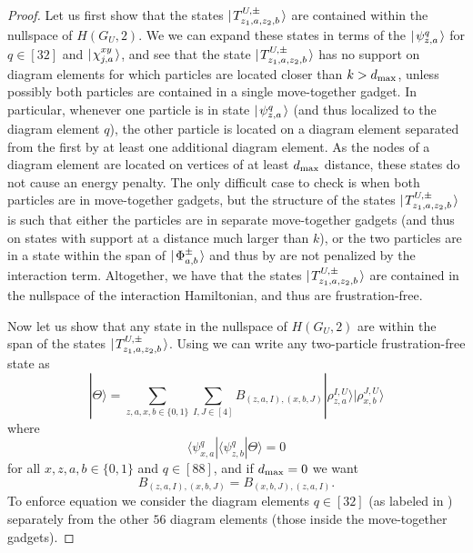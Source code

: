 \documentclass[../thesis-main/thesis-main]{subfiles}
\begin{document}
\begin{proof}

Let us first show that the states $|\mspace{2mu} T_{z_1,a,z_2,b}^{U,\pm} \mspace{2mu} \rangle$ are contained within the nullspace of $H(G_U,2)$.   We we can expand these states in terms of the $|\mspace{2mu} \psi^q_{z,a} \mspace{2mu} \rangle$ for $q\in[32]$ and $|\mspace{2mu} \chi_{j,a}^{xy} \mspace{2mu} \rangle$, and see that the state $|\mspace{2mu} T_{z_1,a,z_2,b}^{U,\pm} \mspace{2mu} \rangle$ has no support on diagram elements for which particles are located closer than $k > d_{\text{max}}$, unless possibly both particles are contained in a single move-together gadget.   In particular, whenever one particle is in state $|\mspace{2mu} \psi^q_{z,a} \mspace{2mu} \rangle$ (and thus localized to the diagram element $q$), the other particle is located on a diagram element separated from the first by at least one additional diagram element.  As the nodes of a diagram element are located on vertices of at least $d_{\text{max}}$ distance, these states do not cause an energy penalty.  The only difficult case to check is when both particles are in move-together gadgets, but the structure of the states $|\mspace{2mu} T_{z_1,a,z_2,b}^{U,\pm} \mspace{2mu} \rangle$ is such that either the particles are in separate move-together gadgets (and thus on states with support at a distance much larger than $k$), or the two particles are in a state within the span of $|\mspace{2mu} \Phi_{a,b}^{\pm} \mspace{2mu} \rangle$ and thus by  are not penalized by the interaction term.  Altogether, we have that the states $|\mspace{2mu} T_{z_1,a,z_2,b}^{U,\pm} \mspace{2mu} \rangle$ are contained in the nullspace of the interaction Hamiltonian, and thus are frustration-free.

Now let us show that any state in the nullspace of $H(G_U,2)$ are within the span of the states $|\mspace{2mu} T_{z_1,a,z_2,b}^{U,\pm} \mspace{2mu} \rangle$. Using  we can write any two-particle frustration-free state as 
\begin{equation}
  |\Theta\rangle=\sum_{z,a,x,b\in \{0,1\}}\sum_{I,J\in [4]}B_{\left(z,a,I\right),\left(x,b,J\right)}|\rho_{z,a}^{I,U}\rangle|\rho_{x,b}^{J,U}\rangle
\label{eq:thetastate}
\end{equation}
where 
\begin{equation}
\langle\psi_{x,a}^{q}|\langle\psi_{z,b}^{q}|\Theta\rangle=0\label{eq:ff_condition}
\end{equation}
for all $x,z,a,b\in\{0,1\}$ and $q\in[88]$, and if $d_{\text{max}} = 0$ we want 
\begin{equation}
B_{\left(z,a,I\right),\left(x,b,J\right)}=B_{\left(x,b,J\right),\left(z,a,I\right)}. \label{eq:sym_B}
\end{equation}
 To enforce equation  we consider the diagram elements $q\in [32]$ (as labeled in ) separately from the other $56$ diagram elements (those inside the move-together gadgets). 


\end{proof}
\end{document}

